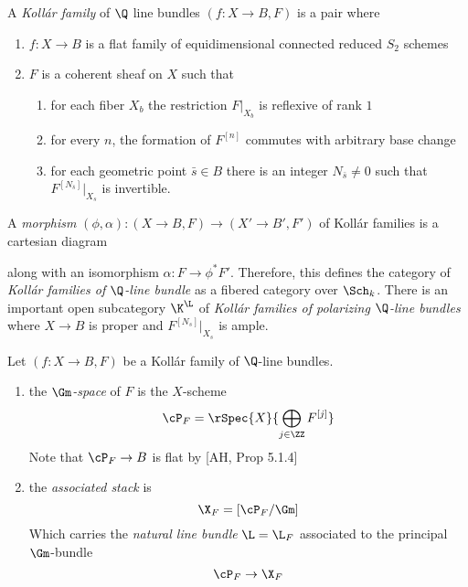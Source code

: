 \documentclass[12pt]{article}
\begin{document}
\begin{defn}
A \textit{Koll\'{a}r family} of $\Q$ line bundles $(f : X \to B, F)$ is a pair where
\begin{enumerate}
\item $f : X \to B$ is a flat family of equidimensional connected reduced $S_2$ schemes
\item $F$ is a coherent sheaf on $X$ such that
\begin{enumerate}
\item for each fiber $X_b$ the restriction $F|_{X_b}$ is reflexive of rank $1$
\item for every $n$, the formation of $F^{[n]}$ commutes with arbitrary base change
\item for each geometric point $\bar{s} \in B$ there is an integer $N_{\bar{s}} \neq 0$ such that $F^{[N_{\bar{s}}]}|_{X_s}$ is invertible.
\end{enumerate} 
\end{enumerate}
A \textit{morphism} $(\phi, \alpha) : (X \to B, F) \to (X' \to B', F')$ of Koll\'{a}r families is a cartesian diagram
\begin{center}
\end{center}
along with an isomorphism $\alpha : F \to \phi^* F'$. Therefore, this defines the category of \textit{Koll\'{a}r families of $\Q$-line bundle} as a fibered category over $\Sch_k$. There is an important open subcategory $\K^{\L}$ of \textit{Koll\'{a}r families of polarizing $\Q$-line bundles} where $X \to B$ is proper and $F^{[N_s]}|_{X_s}$ is ample. 
\end{defn}

\begin{defn}
Let $(f : X \to B, F)$ be a Koll\'{a}r family of $\Q$-line bundles.
\begin{enumerate}
\item the $\Gm$\textit{-space} of $F$ is the $X$-scheme
\[ \cP_F = \rSpec{X}{\bigoplus_{j \in \ZZ} F^{[j]}} \]
Note that $\cP_F \to B$ is flat by [AH, Prop 5.1.4]
\item the \textit{associated stack} is
\[ \X_F = [\cP_F / \Gm] \]
Which carries the \textit{natural line bundle} $\L = \L_F$ associated to the principal $\Gm$-bundle
\[ \cP_F \to \X_F \]
\end{enumerate}
\end{defn}
\end{document}
